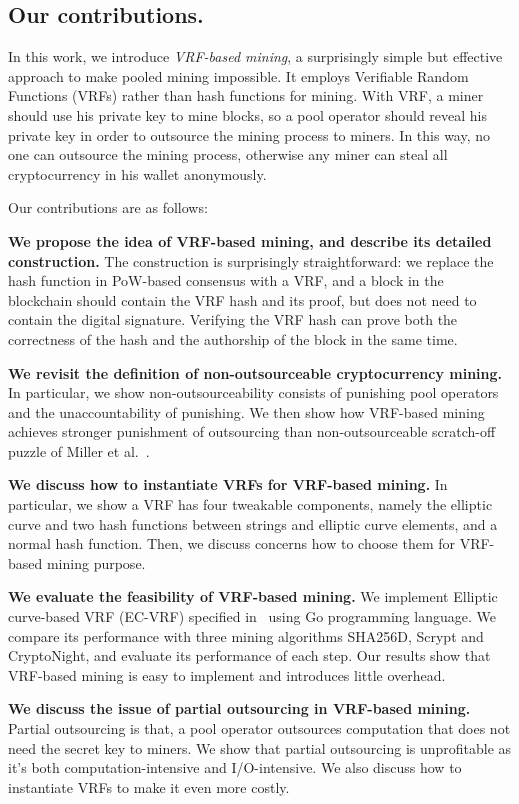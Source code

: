\subsection{Our contributions.}
In this work, we introduce \textit{VRF-based mining}, a surprisingly simple but effective approach to make pooled mining impossible.
It employs Verifiable Random Functions (VRFs) rather than hash functions for mining.
With VRF, a miner should use his private key to mine blocks, so a pool operator should reveal his private key in order to outsource the mining process to miners.
In this way, no one can outsource the mining process, otherwise any miner can steal all cryptocurrency in his wallet anonymously.

Our contributions are as follows:

\textbf{We propose the idea of VRF-based mining, and describe its detailed construction.} The construction is surprisingly straightforward: we replace the hash function in PoW-based consensus with a VRF, and a block in the blockchain should contain the VRF hash and its proof, but does not need to contain the digital signature. Verifying the VRF hash can prove both the correctness of the hash and the authorship of the block in the same time.

\textbf{We revisit the definition of non-outsourceable cryptocurrency mining.} In particular, we show non-outsourceability consists of punishing pool operators and the unaccountability of punishing. We then show how VRF-based mining achieves stronger punishment of outsourcing than non-outsourceable scratch-off puzzle of Miller et al.~\cite{miller2015nonoutsourceable}.

\textbf{We discuss how to instantiate VRFs for VRF-based mining.} In particular, we show a VRF has four tweakable components, namely the elliptic curve and two hash functions between strings and elliptic curve elements, and a normal hash function. Then, we discuss concerns how to choose them for VRF-based mining purpose.

\textbf{We evaluate the feasibility of VRF-based mining.} We implement Elliptic curve-based VRF (EC-VRF) specified in~\cite{goldberg2017draft} using Go programming language. We compare its performance with three mining algorithms SHA256D, Scrypt and CryptoNight, and evaluate its performance of each step. Our results show that VRF-based mining is easy to implement and introduces little overhead.

\textbf{We discuss the issue of partial outsourcing in VRF-based mining.} Partial outsourcing is that, a pool operator outsources computation that does not need the secret key to miners. We show that partial outsourcing is unprofitable as it's both computation-intensive and I/O-intensive. We also discuss how to instantiate VRFs to make it even more costly.


